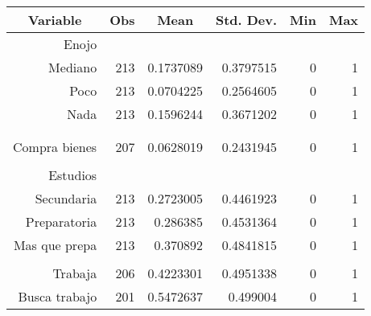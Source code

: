 \begin{tabular}{rrrrrr}
\toprule
\multicolumn{1}{c}{Variable } & \multicolumn{1}{c}{Obs} & \multicolumn{1}{c}{Mean} & \multicolumn{1}{c}{Std. Dev.} & \multicolumn{1}{c}{Min} & \multicolumn{1}{c}{Max} \\
\midrule
Enojo &       &       &       &       &  \\
Mediano & 213   & 0.1737089 & 0.3797515 & 0     & 1 \\
Poco  & 213   & 0.0704225 & 0.2564605 & 0     & 1 \\
Nada  & 213   & 0.1596244 & 0.3671202 & 0     & 1 \\
      &       &       &       &       &  \\
      &       &       &       &       &  \\
Compra bienes & 207   & 0.0628019 & 0.2431945 & 0     & 1 \\
      &       &       &       &       &  \\
Estudios &       &       &       &       &  \\
Secundaria & 213   & 0.2723005 & 0.4461923 & 0     & 1 \\
Preparatoria & 213   & 0.286385 & 0.4531364 & 0     & 1 \\
Mas que prepa & 213   & 0.370892 & 0.4841815 & 0     & 1 \\
      &       &       &       &       &  \\
Trabaja & 206   & 0.4223301 & 0.4951338 & 0     & 1 \\
Busca trabajo & 201   & 0.5472637 & 0.499004 & 0     & 1 \\
\bottomrule
\end{tabular}%
